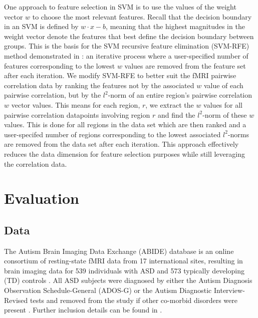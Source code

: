 \documentclass{llncs}
\begin{document}
One approach to feature selection in SVM is to use the values of the weight
vector $w$ to choose the most relevant features.  Recall that the decision
boundary in an SVM is defined by $w \cdot x - b$, meaning that the highest
magnitudes in the weight vector denote the features that best define the
decision boundary between groups. This is the basis for the SVM recursive
feature elimination (SVM-RFE) method demonstrated in
\cite{guyon2002gene,abide,ecker2010}: an iterative process where a
user-specified number of features corresponding to the lowest $w$ values are
removed from the feature set after each iteration. We modify SVM-RFE to better
suit the fMRI pairwise correlation data by ranking the features not by the
associated $w$ value of each pairwise correlation, but by the $l^2$-norm of an
entire region's pairwise correlation $w$ vector values. This means for each
region, $r$, we extract the $w$ values for all pairwise correlation datapoints
involving region $r$ and find the $l^2$-norm of these $w$ values. This is done
for all regions in the data set which are then ranked and a user-specifed number
of regions corresponding to the lowest associated $l^2$-norms are removed from
the data set after each iteration.  This approach effectively reduces the data
dimension for feature selection purposes while still leveraging the correlation
data.

\section{Evaluation}
\subsection{Data}
The Autism Brain Imaging Data Exchange (ABIDE) database is an online consortium
of resting-state fMRI data from 17 international sites, resulting in
brain imaging data for 539 individuals with ASD and 573 typically developing
(TD) controls \cite{abide}. All ASD subjects were diagnosed by either the Autism
Diagnosis Observation Schedule-General (ADOS-G) or the Autism Diagnostic
Interview-Revised tests and removed from the study if other co-morbid disorders
were present  \cite{abide,lordADOS,lordADIR}.  Further inclusion
details can be found in \cite{abide}.
\end{document}
